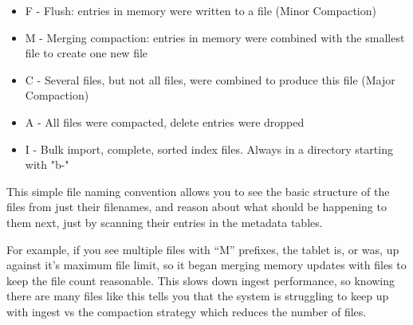 \begin{itemize}
 \item F - Flush: entries in memory were written to a file (Minor Compaction)
 \item M - Merging compaction: entries in memory were combined with the smallest file to create one new file
 \item C - Several files, but not all files, were combined to produce this file (Major Compaction)
 \item A - All files were compacted, delete entries were dropped
 \item I - Bulk import, complete, sorted index files. Always in a directory starting with "b-"
\end{itemize}

This simple file naming convention allows you to see the basic structure of the files from just 
their filenames, and reason about what should be happening to them next, just
by scanning their entries in the metadata tables.

For example, if you see multiple files with ``M'' prefixes, the tablet is, or was, up against it's
maximum file limit, so it began merging memory updates with files to keep the file count reasonable.  This
slows down ingest performance, so knowing there are many files like this tells you that the system
is struggling to keep up with ingest vs the compaction strategy which reduces the number of files.

